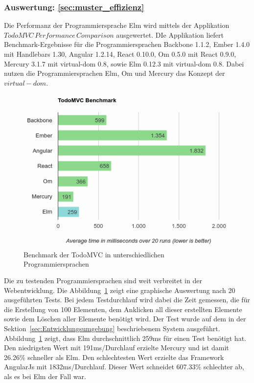 \subsubsection{Auswertung: \ref{sec:muster_effizienz} }
Die Performanz der Programmiersprache Elm wird mittels der Applikation $TodoMVC\,Performance\,Comparison$ ausgewertet. DIe Applikation liefert Benchmark-Ergebnisse für die Programmiersprachen Backbone 1.1.2, Ember 1.4.0 mit Handlebars 1.30, Angular 1.2.14, React 0.10.0, Om 0.5.0 mit React 0.9.0, Mercury 3.1.7 mit virtual-dom 0.8, sowie Elm 0.12.3 mit virtual-dom 0.8. Dabei nutzen die Programmiersprachen Elm, Om und Mercury das Konzept der $virtual-dom$.
\begin{figure}[h]
\centering
\includegraphics[scale=0.6]{img/elm-benchmark-final.png}
\caption{Benchmark der TodoMVC in unterschiedlichen Programmiersprachen}\label{fig:elm-todo-benchmarks}
\end{figure}
Die zu testenden Programmiersprachen sind weit verbreitet in der Webentwicklung. Die Abbildung~\ref{fig:elm-todo-benchmarks} zeigt eine graphische Auswertung nach 20 ausgeführten Tests. Bei jedem Testdurchlauf wird dabei die Zeit gemessen, die für die Erstellung von 100 Elementen, dem Anklicken all dieser erstellten Elemente sowie dem Löschen aller Elemente benötigt wird. Der Test wurde auf dem in der Sektion~\ref{sec:Entwicklungsumgebung} beschriebenem System ausgeführt. Abbildung~\ref{fig:elm-todo-benchmarks} zeigt, dass Elm durchschnittlich 259ms für einen Test benötigt hat. Den niedrigsten Wert mit 191ms/Durchlauf erzielte Mercury und ist damit 26.26\% schneller als Elm. Den schlechtesten Wert erzielte das Framework AngularJs mit 1832ms/Durchlauf. Dieser Wert schneidet 607.33\% schlechter ab, als es bei Elm der Fall war.
